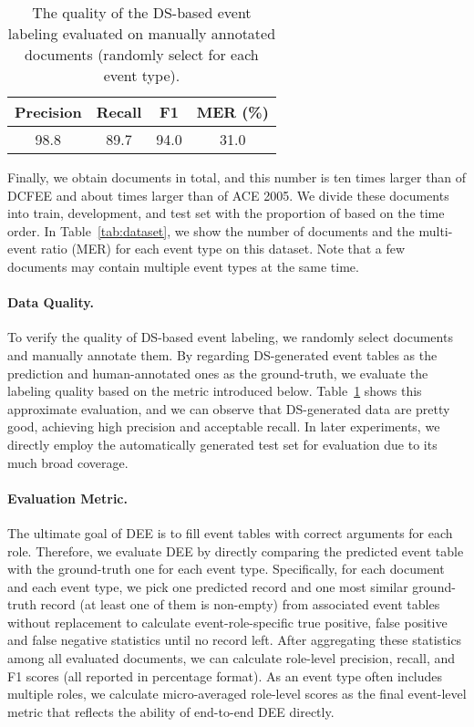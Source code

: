 \documentclass[11pt,a4paper]{article}
\begin{document}
\begin{table}[tb]\small
\centering
\addtolength{\tabcolsep}{-1.5pt}
\begin{tabular}{c c c c}
\toprule
\textbf{Precision} & \textbf{Recall} & \textbf{F1} & \textbf{MER (\%)} \\
\midrule
98.8 & 89.7 & 94.0 & 31.0
\\
\bottomrule
\end{tabular}
\caption{The quality of the DS-based event labeling evaluated on  manually annotated documents (randomly select  for each event type).}
\label{tab:label_quality}
\end{table}



Finally, we obtain  documents in total,
and this number is ten times larger than  of DCFEE and about  times larger than  of ACE 2005.
We divide these documents into train, development, and test set with the proportion of  based on the time order.
In Table~\ref{tab:dataset}, we show the number of documents and the multi-event ratio (MER) for each event type on this dataset.
Note that a few documents may contain multiple event types at the same time.



\paragraph{Data Quality.}
To verify the quality of DS-based event labeling,
we randomly select  documents and manually annotate them.
By regarding DS-generated event tables as the prediction and human-annotated ones as the ground-truth,
we evaluate the labeling quality based on the metric introduced below.
Table~\ref{tab:label_quality} shows this approximate evaluation,
and we can observe that DS-generated data are pretty good, achieving high precision and acceptable recall.
In later experiments, we directly employ the automatically generated test set for evaluation due to its much broad coverage.


\paragraph{Evaluation Metric.}
The ultimate goal of DEE is to fill event tables with correct arguments for each role.
Therefore, we evaluate DEE by directly comparing the predicted event table with the ground-truth one for each event type.
Specifically, for each document and each event type, we pick one predicted record and one most similar ground-truth record (at least one of them is non-empty) from associated event tables without replacement to calculate event-role-specific true positive, false positive and false negative statistics until no record left.
After aggregating these statistics among all evaluated documents, we can calculate role-level precision, recall, and F1 scores (all reported in percentage format).
As an event type often includes multiple roles, we calculate micro-averaged role-level scores as the final event-level metric that reflects the ability of end-to-end DEE directly.
\end{document}

